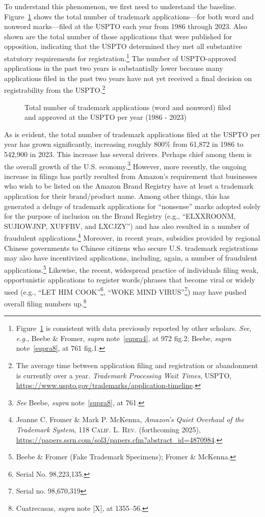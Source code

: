 \documentclass[letterpaper, 11pt, oneside]{article}
\begin{document}
To understand this phenomenon, we first need to understand the baseline. Figure~\ref{fig:1} shows the total number of trademark applications—for both word and nonword marks—filed at the USPTO each year from 1986 through 2023. Also shown are the total number of those applications that were published for opposition, indicating that the USPTO determined they met all substantive statutory requirements for registration.\footnote{Figure~\ref{fig:1} is consistent with data previously reported by other scholars. \textit{See, e.g.}, Beebe \& Fromer, \textit{supra} note~\ref{supra4}, at 972 fig.2; Beebe, \textit{supra} note~\ref{supra8}, at 761 fig.1.} The number of USPTO-approved applications in the past two years is substantially lower because many applications filed in the past two years have not yet received a final decision on registrability from the USPTO.\footnote{The average time between application filing and registration or abandonment is currently over a year. \textit{Trademark Processing Wait Times}, USPTO, \url{https://www.uspto.gov/trademarks/application-timeline}.}

\begin{figure}[H]
\centering

\caption{\label{fig:1} Total number of trademark applications (word and nonword) filed and approved at the USPTO per year (1986 - 2023)}
\end{figure}

As is evident, the total number of trademark applications filed at the USPTO per year has grown significantly, increasing roughly 800\% from 61,872 in 1986 to 542,900 in 2023. This increase has several drivers. Perhaps chief among them is the overall growth of the U.S. economy.\footnote{\textit{See} Beebe, \textit{supra} note~\ref{supra8}, at 761.} However, more recently, the ongoing increase in filings has partly resulted from Amazon's requirement that businesses who wish to be listed on the Amazon Brand Registry have at least a trademark application for their brand/product name. Among other things, this has generated a deluge of trademark applications for ``nonsense'' marks adopted solely for the purpose of inclusion on the Brand Registry (e.g., ``ELXXROONM, SUJIOWJNP, XUFFBV, and LXCJZY'') and has also resulted in a number of fraudulent applications.\footnote{Jeanne C. Fromer \& Mark P. McKenna, \textit{Amazon's Quiet Overhaul of the Trademark System}, 118 \textsc{Calif. L. Rev.} (forthcoming 2025), \url{https://papers.ssrn.com/sol3/papers.cfm?abstract_id=4870984}.} Moreover, in recent years, subsidies provided by regional Chinese governments to Chinese citizens who secure U.S. trademark registrations may also have incentivized applications, including, again, a number of fraudulent applications.\footnote{Beebe \& Fromer (Fake Trademark Specimens); Fromer \& McKenna.} Likewise, the recent, widespread practice of individuals filing weak, opportunistic applications to register words/phrases that become viral or widely used (e.g., ``LET HIM COOK''\footnote{Serial No. 98,223,135.}, ``WOKE MIND VIRUS''\footnote{Serial no. 98,670,319}) may have pushed overall filing numbers up.\footnote{Cuatrecasas, \textit{supra} note [X], at 1355–56.}
\end{document}

